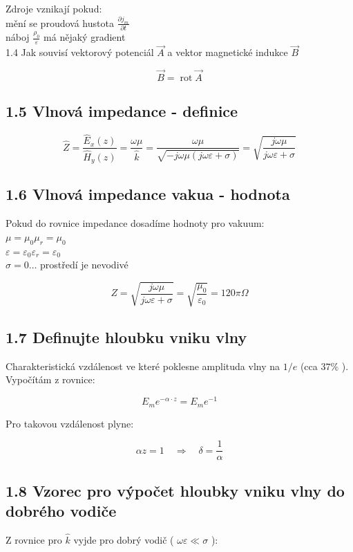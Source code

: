 \documentclass[10pt]{article}
\begin{document}
Zdroje vznikají pokud:\\
mění se proudová hustota $\frac{\partial j_{m}}{\partial t}$\\
náboj $\frac{\rho_{0}}{\varepsilon}$ má nějaký gradient\\
1.4 Jak souvisí vektorový potenciál $\vec{A}$ a vektor magnetické indukce $\vec{B}$

$$
\vec{B}=\operatorname{rot} \vec{A}
$$

\subsection*{1.5 Vlnová impedance - definice}
$$
\hat{Z}=\frac{\hat{E}_{x}(z)}{\hat{H}_{y}(z)}=\frac{\omega \mu}{\hat{k}}=\frac{\omega \mu}{\sqrt{-j \omega \mu(j \omega \varepsilon+\sigma)}}=\sqrt{\frac{j \omega \mu}{j \omega \varepsilon+\sigma}}
$$

\subsection*{1.6 Vlnová impedance vakua - hodnota}
Pokud do rovnice impedance dosadíme hodnoty pro vakuum:\\
$\mu=\mu_{0} \mu_{r}=\mu_{0}$\\
$\varepsilon=\varepsilon_{0} \varepsilon_{r}=\varepsilon_{0}$\\
$\sigma=0 \ldots$ prostředí je nevodivé

$$
Z=\sqrt{\frac{j \omega \mu}{j \omega \varepsilon+\sigma}}=\sqrt{\frac{\mu_{0}}{\varepsilon_{0}}}=120 \pi \Omega
$$

\subsection*{1.7 Definujte hloubku vniku vlny}
Charakteristická vzdálenost ve které poklesne amplituda vlny na $1 / e$ (cca $37 \%$ ). Vypočítám z rovnice:

$$
E_{m} e^{-\alpha \cdot z}=E_{m} e^{-1}
$$

Pro takovou vzdálenost plyne:

$$
\alpha z=1 \quad \Rightarrow \quad \delta=\frac{1}{\alpha}
$$

\subsection*{1.8 Vzorec pro výpočet hloubky vniku vlny do dobrého vodiče}
Z rovnice pro $\hat{k}$ vyjde pro dobrý vodič ( $\omega \varepsilon \ll \sigma$ ):
\end{document}
